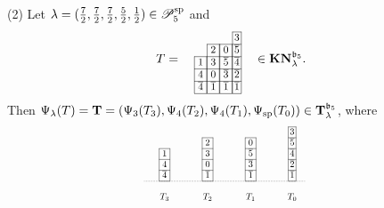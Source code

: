 \documentclass[leqno,11pt]{amsart}
\numberwithin{equation}{section}
\newcommand{\cP}{\mathscr{P}}
\newcommand{\ov}{\overline}
\newcommand{\mf}{\mathfrak}
\newcommand{\la}{\lambda}
\begin{document}
(2) Let $\la=(\frac{7}{2},\frac{7}{2},\frac{7}{2},\frac{5}{2},\frac{1}{2})\in \cP_5^{\rm sp}$ and  
$$
T=\quad
\resizebox{.11\hsize}{!}
{\def\lr#1{\multicolumn{1}{|@{\hspace{.75ex}}c@{\hspace{.75ex}}|}{\raisebox{-.04ex}{$#1$}}}\raisebox{-.6ex}
{$\begin{array}{cccc}
\cline{4-4}
& & & \lr{\!3\!} \\
\cline{2-4}
& \lr{2} & \lr{0} &\lr{\!\ov 5\!}\\
\cline{1-4}
\lr{1} & \lr{3} & \lr{\ov 5} &\lr{\!\ov 4\!}\\
\cline{1-1}\cline{2-2}\cline{3-3}\cline{4-4}
\lr{4}&\lr{0} & \lr{\ov 3}&\lr{\!\ov 2\!}\\
\cline{1-1}\cline{2-2}\cline{3-3}\cline{4-4}
\lr{\ov 4}&\lr{\ov 1} & \lr{\ov 1}&\lr{\!\ov 1\!}\\
\cline{1-1}\cline{2-2}\cline{3-3}\cline{4-4} 
\end{array}$}}\quad  \in {\bf KN}^{\mf b_5}_{\la}.
$$ 
\noindent Then
%
$\Psi_{\la}(T)={\bf T}=
(\Psi_3(T_3),\Psi_4(T_2),\Psi_4(T_1),\Psi_{\rm sp}(T_0))
\in {\bf T}^{\mf b_5}_{\la}$, where
%
$$\ 
\resizebox{.42\hsize}{!}
{\def\lr#1{\multicolumn{1}{|@{\hspace{.75ex}}c@{\hspace{.75ex}}|}{\raisebox{-.04ex}{$#1$}}}\raisebox{-.6ex}
{$\begin{array}{ccccccccccccccccc}
\cline{14-14}
& & & & & & & & & & & & &\lr{\!3\!}\\
\cline{6-6}\cline{10-10}\cline{14-14}
&  & & & & \lr{2} & & & & \lr{0} & & & &\lr{\!\ov 5\!}\\
\cline{2-2}\cline{6-6}\cline{10-10}\cline{14-14}
& \lr{1} & & & & \lr{3} & & & & \lr{\ov 5} & & & &\lr{\!\ov 4\!}\\
\cline{2-2}\cline{6-6}\cline{10-10}\cline{14-14}
& \lr{4} & & & & \lr{0} & & & & \lr{\ov 3} & & & & \lr{\!\ov 2\!}\\
\cline{2-2}\cline{6-6}\cline{10-10}\cline{14-14}
\ \, &\lr{\ov 4} & &  \, \ & & \lr{\ov 1} & &   \, \ & & \lr{\ov 1} & &  \, \ & & \lr{\!\ov 1\!}& \\
\cline{2-2}\cline{6-6}\cline{10-10}\cline{14-14}\cdashline{1-15}[0.5pt/1pt]\\ 
\ \  & \!\!\!\!\!\!\!\!\!T_3 \!\!\!\!\!\!\!\!\! & & &
& \!\!\!\!\!\!\!\!\!T_2 \!\!\!\!\!\!\!\!\! & & &
& \!\!\!\!\!\!\!\!\!T_1 \!\!\!\!\!\!\!\!\! & & & 
& \!\!\!\!\!\!\!\!\!T_0 \!\!\!\!\!\!\!\!\! & & & 
\end{array}$}}
$$
\end{document}
